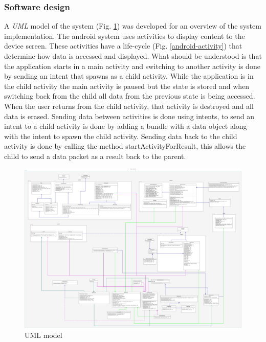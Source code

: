 \subsubsection{Software design}
A \textit{UML}\cite{uml} model of the system (Fig. \ref{android-uml}) was developed for an overview of the system implementation. The android system uses activities\cite{activity} to display content to the device screen. These activities have a life-cycle (Fig. \ref{android-activity}) that determine how data is accessed and displayed. What should be understood is that the application starts in a main activity and switching to another activity is done by sending an intent that spawns as a child activity. While the application is in the child activity the main activity is paused but the state is stored and when switching back from the child all data from the previous state is being accessed. When the user returns from the child activity,  that activity is destroyed and all data is erased. Sending data between activities is done using intents, to send an intent to a child activity is done by adding a bundle with a data object along with the intent to spawn the child activity. Sending data back to the child activity is done by calling the method startActivityForResult, this allows the child to send a data packet as a result back to the parent. 
\begin{figure}[H]
\centering
\includegraphics[width=1\textwidth]{Figures/uml.png}
\caption{UML model}
\label{android-uml}
\end{figure}
